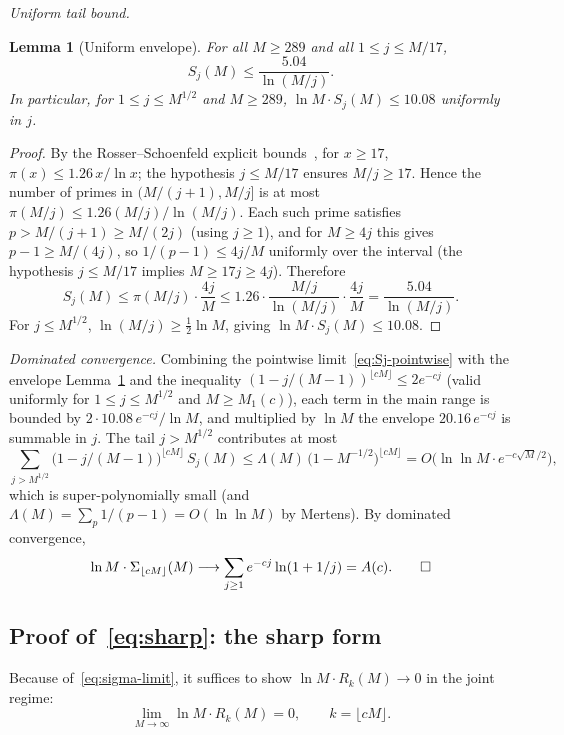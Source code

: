 \documentclass[11pt]{article}
\newtheorem{lemma}[theorem]{Lemma}
\theoremstyle{remark}
\begin{document}
\emph{Uniform tail bound.}

\begin{lemma}[Uniform envelope]\label{lem:envelope}
For all $M \geq 289$ and all $1 \leq j \leq M/17$,
\[
S_j(M) \leq \frac{5.04}{\ln(M/j)}.
\]
In particular, for $1 \leq j \leq M^{1/2}$ and $M \geq 289$, $\ln M \cdot S_j(M) \leq 10.08$ uniformly in $j$.
\end{lemma}
\begin{proof}
By the Rosser--Schoenfeld explicit bounds~\cite{RosserSchoenfeld1962}, for $x \geq 17$, $\pi(x) \leq 1.26\, x/\ln x$; the hypothesis $j \leq M/17$ ensures $M/j \geq 17$. Hence the number of primes in $(M/(j+1), M/j]$ is at most $\pi(M/j) \leq 1.26(M/j)/\ln(M/j)$. Each such prime satisfies $p > M/(j+1) \geq M/(2j)$ (using $j \geq 1$), and for $M \geq 4j$ this gives $p - 1 \geq M/(4j)$, so $1/(p-1) \leq 4j/M$ uniformly over the interval (the hypothesis $j \leq M/17$ implies $M \geq 17j \geq 4j$). Therefore
\[
S_j(M) \leq \pi(M/j) \cdot \frac{4j}{M} \leq 1.26 \cdot \frac{M/j}{\ln(M/j)} \cdot \frac{4j}{M} = \frac{5.04}{\ln(M/j)}.
\]
For $j \leq M^{1/2}$, $\ln(M/j) \geq \tfrac12 \ln M$, giving $\ln M \cdot S_j(M) \leq 10.08$.
\end{proof}

\emph{Dominated convergence.} Combining the pointwise limit~\eqref{eq:Sj-pointwise} with the envelope Lemma~\ref{lem:envelope} and the inequality $(1 - j/(M-1))^{\lfloor cM \rfloor} \leq 2 e^{-cj}$ (valid uniformly for $1 \leq j \leq M^{1/2}$ and $M \geq M_1(c)$), each term in the main range is bounded by $2 \cdot 10.08\, e^{-cj}/\ln M$, and multiplied by $\ln M$ the envelope $20.16\, e^{-cj}$ is summable in $j$. The tail $j > M^{1/2}$ contributes at most
\[
\sum_{j > M^{1/2}}\bigl(1 - j/(M-1)\bigr)^{\lfloor cM \rfloor}\, S_j(M) \leq \Lambda(M)\,\bigl(1 - M^{-1/2}\bigr)^{\lfloor cM \rfloor} = O\bigl(\ln\ln M\cdot e^{-c\sqrt{M}/2}\bigr),
\]
which is super-polynomially small (and $\Lambda(M) = \sum_p 1/(p-1) = O(\ln\ln M)$ by Mertens). By dominated convergence,
\[
\ln M \cdot \Sigma_{\lfloor cM \rfloor}(M) \longrightarrow \sum_{j \geq 1} e^{-cj}\ln(1 + 1/j) = A(c). \qed
\]

\subsection{Proof of~\eqref{eq:sharp}: the sharp form}\label{sec:thm4-sharp}

Because of~\eqref{eq:sigma-limit}, it suffices to show $\ln M \cdot R_k(M) \to 0$ in the joint regime:
\begin{equation}\label{eq:Rk-sharp}
\lim_{M \to \infty} \ln M \cdot R_k(M) = 0, \qquad k = \lfloor cM \rfloor.
\end{equation}
\end{document}
